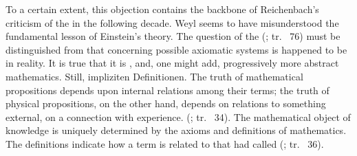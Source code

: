 \documentclass[draft]{article}
\newcommand{\rhp}[2]{(\cite[#1]{Reichenbach1920a}; tr.\ \citeyear{Reichenbach1969} #2)\xspace}
\begin{document}
%
To a certain extent, this objection contains the backbone of Reichenbach's criticism of the \uftp in the following decade. Weyl seems to have misunderstood the fundamental lesson of Einstein's theory. The question of the  \rhp{73}{76} must be distinguished from that concerning possible axiomatic systems is happened to be in reality. It is true that it is , and, one might add, progressively more abstract mathematics. Still,  {impliziten Definitionen}. The truth of mathematical propositions depends upon internal relations among their terms; the truth of physical propositions, on the other hand, depends on relations to something external, on a connection with experience.  \rhp{33}{34}. The mathematical object of knowledge is uniquely determined by the axioms and definitions of mathematics. The definitions indicate how a term is related to that \citet{Schlick1918} had called  \rhp{33}{36}. 
\end{document}
